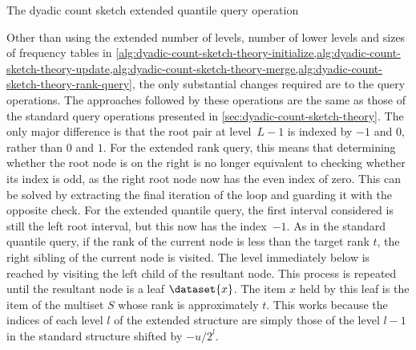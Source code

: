\begin{algorithm}
  \caption{The dyadic count sketch extended quantile query operation}
  \label{alg:dyadic-count-sketch-analysis-universe-extended-quantile-query}
  
\end{algorithm}

Other than using the extended number of levels, number of lower levels and sizes of frequency tables in \cref{alg:dyadic-count-sketch-theory-initialize,alg:dyadic-count-sketch-theory-update,alg:dyadic-count-sketch-theory-merge,alg:dyadic-count-sketch-theory-rank-query}, the only substantial changes required are to the query operations.
The approaches followed by these operations are the same as those of the standard query operations presented in \cref{sec:dyadic-count-sketch-theory}.
The only major difference is that the root pair at level~\( L - 1 \) is indexed by \( -1 \) and \( 0 \), rather than \( 0 \) and \( 1 \).
For the extended rank query, this means that determining whether the root node is on the right is no longer equivalent to checking whether its index is odd, as the right root node now has the even index of zero.
This can be solved by extracting the final iteration of the loop and guarding it with the opposite check.
For the extended quantile query, the first interval considered is still the left root interval, but this now has the index~\( -1 \).
As in the standard quantile query, if the rank of the current node is less than the target rank \( t \), the right sibling of the current node is visited.
The level immediately below is reached by visiting the left child of the resultant node.
This process is repeated until the resultant node is a leaf \( \dataset{x} \).
The item \( x \) held by this leaf is the item of the multiset \( S \) whose rank is approximately \( t \).
This works because the indices of each level \( l \) of the extended structure are simply those of the level \( l - 1 \) in the standard structure shifted by \( -u / 2^{l} \).

